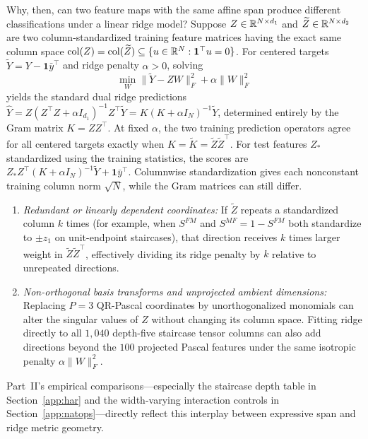 Why, then, can two feature maps with the same affine span produce different
classifications under a linear ridge model? Suppose \(Z \in \mathbb{R}^{N \times d_1}\)
and \(\widetilde Z \in \mathbb{R}^{N \times d_2}\) are two column-standardized training
feature matrices having the exact same column space \(\operatorname{col}(Z) = \operatorname{col}(\widetilde Z) \subseteq \{u \in \mathbb{R}^N : \mathbf 1^\top u = 0\}\).
For centered targets \(\widetilde Y = Y - \mathbf 1 \bar y^\top\) and ridge
penalty \(\alpha > 0\), solving
\[
 \min_{W} \|\widetilde Y - Z W\|_F^2 + \alpha \|W\|_F^2
\]
yields the standard dual ridge predictions~\cite{ridge}
\(\widehat Y = Z(Z^\top Z + \alpha I_{d_1})^{-1} Z^\top \widetilde Y = K(K + \alpha I_N)^{-1} \widetilde Y\),
determined entirely by the Gram matrix \(K = Z Z^\top\). At fixed \(\alpha\),
the two training prediction operators agree for all centered targets exactly
when \(K = \widetilde K = \widetilde Z \widetilde Z^\top\). For test features
\(Z_*\) standardized using the training statistics, the scores are
\(Z_* Z^\top (K + \alpha I_N)^{-1}\widetilde Y + \mathbf 1\bar y^\top\).
Columnwise standardization gives each nonconstant training column norm
\(\sqrt N\), while the Gram matrices can still differ.
\begin{enumerate}
\item \emph{Redundant or linearly dependent coordinates:} If \(\widetilde Z\)
repeats a standardized column \(k\) times (for example, when \(S^{FM}\) and
\(S^{MF} = 1 - S^{FM}\) both standardize to \(\pm z_1\) on unit-endpoint
staircases), that direction receives \(k\) times larger weight in
\(\widetilde Z \widetilde Z^\top\), effectively dividing its ridge penalty by
\(k\) relative to unrepeated directions.
\item \emph{Non-orthogonal basis transforms and unprojected ambient dimensions:}
Replacing \(P=3\) QR-Pascal coordinates by unorthogonalized monomials can alter
the singular values of \(Z\) without changing its column space. Fitting ridge
directly to all \(1{,}040\) depth-five staircase tensor columns can also add
directions beyond the \(100\) projected Pascal features under the same isotropic
penalty \(\alpha \|W\|_F^2\).
\end{enumerate}
Part~II's empirical comparisons---especially the staircase depth table in
Section~\ref{app:har} and the width-varying interaction controls in
Section~\ref{app:natops}---directly reflect this interplay between expressive span
and ridge metric geometry.
